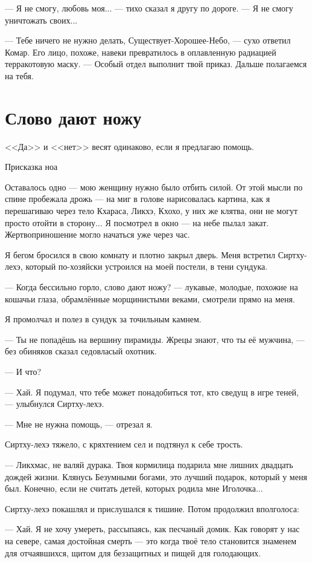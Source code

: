 --- Я не смогу, любовь моя... --- тихо сказал я другу по дороге.
--- Я не смогу уничтожать своих...

--- Тебе ничего не нужно делать, Существует-Хорошее-Небо, --- сухо ответил Комар.
Его лицо, похоже, навеки превратилось в оплавленную радиацией терракотовую маску.
--- Особый отдел выполнит твой приказ.
Дальше полагаемся на тебя.

\section{Слово дают ножу}

\epigraph{
<<Да>> и <<нет>> весят одинаково, если я предлагаю помощь.
}{
Присказка ноа
}

Оставалось одно --- мою женщину нужно было отбить силой.
От этой мысли по спине пробежала дрожь --- на миг в голове нарисовалась картина, как я перешагиваю через тело Кхараса, Ликхэ, Кхохо, у них же клятва, они не могут просто отойти в сторону...
Я посмотрел в окно --- на небе пылал закат.
Жертвоприношение могло начаться уже через час.

Я бегом бросился в свою комнату и плотно закрыл дверь.
Меня встретил Сиртху-лехэ, который по-хозяйски устроился на моей постели, в тени сундука.

--- Когда бессильно горло, слово дают ножу? --- лукавые, молодые, похожие на кошачьи глаза, обрамлённые морщинистыми веками, смотрели прямо на меня.

Я промолчал и полез в сундук за точильным камнем.

--- Ты не попадёшь на вершину пирамиды.
Жрецы знают, что ты её мужчина, --- без обиняков сказал седовласый охотник.

--- И что?

--- Хай.
Я подумал, что тебе может понадобиться тот, кто сведущ в игре теней, --- улыбнулся Сиртху-лехэ.

--- Мне не нужна помощь, --- отрезал я.

Сиртху-лехэ тяжело, с кряхтением сел и подтянул к себе трость.

--- Ликхмас, не валяй дурака.
Твоя кормилица подарила мне лишних двадцать дождей жизни.
Клянусь Безумными богами, это лучший подарок, который у меня был.
Конечно, если не считать детей, которых родила мне Иголочка...

Сиртху-лехэ покашлял и прислушался к тишине.
Потом продолжил вполголоса:

--- Хай.
Я не хочу умереть, рассыпаясь, как песчаный домик.
Как говорят у нас на севере, самая достойная смерть --- это когда твоё тело становится знаменем для отчаявшихся, щитом для беззащитных и пищей для голодающих.

